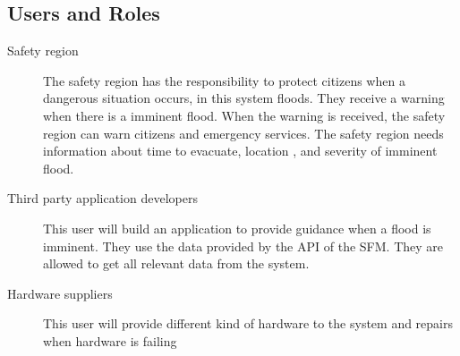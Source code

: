\subsection{Users and Roles}
\begin{description}
	\item[Safety region] The safety region has the responsibility to protect citizens when a dangerous situation occurs, in this system floods. They receive a warning when there is a imminent flood. When the warning is received, the safety region can warn citizens and emergency services. The safety region needs information about time to evacuate, location , and severity of imminent flood.
	\item[Third party application developers] This user will build an application to provide guidance when a flood is imminent. They use the data provided by the \gls{API} of the \gls{SFM}. They are allowed to get all relevant data from the system.
	\item[Hardware suppliers] This user will provide different kind of hardware to the system and repairs when hardware is failing
\end{description} 

